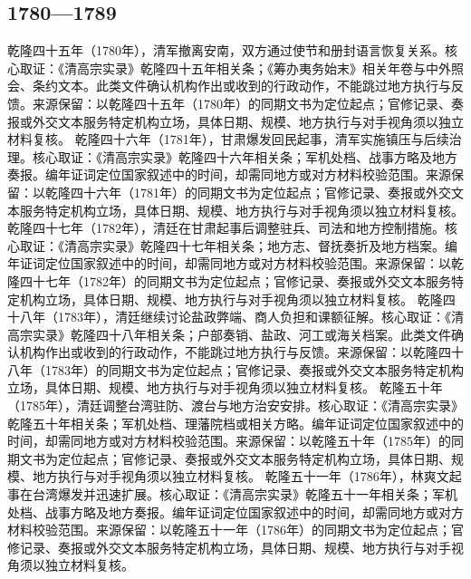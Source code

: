 \subsection{1780—1789}
乾隆四十五年（1780年），清军撤离安南，双方通过使节和册封语言恢复关系。核心取证：《清高宗实录》乾隆四十五年相关条；《筹办夷务始末》相关年卷与中外照会、条约文本。此类文件确认机构作出或收到的行政动作，不能跳过地方执行与反馈。来源保留：以乾隆四十五年（1780年）的同期文书为定位起点；官修记录、奏报或外交文本服务特定机构立场，具体日期、规模、地方执行与对手视角须以独立材料复核。
乾隆四十六年（1781年），甘肃爆发回民起事，清军实施镇压与后续治理。核心取证：《清高宗实录》乾隆四十六年相关条；军机处档、战事方略及地方奏报。编年证词定位国家叙述中的时间，却需同地方或对方材料校验范围。来源保留：以乾隆四十六年（1781年）的同期文书为定位起点；官修记录、奏报或外交文本服务特定机构立场，具体日期、规模、地方执行与对手视角须以独立材料复核。
乾隆四十七年（1782年），清廷在甘肃起事后调整驻兵、司法和地方控制措施。核心取证：《清高宗实录》乾隆四十七年相关条；地方志、督抚奏折及地方档案。编年证词定位国家叙述中的时间，却需同地方或对方材料校验范围。来源保留：以乾隆四十七年（1782年）的同期文书为定位起点；官修记录、奏报或外交文本服务特定机构立场，具体日期、规模、地方执行与对手视角须以独立材料复核。
乾隆四十八年（1783年），清廷继续讨论盐政弊端、商人负担和课额征解。核心取证：《清高宗实录》乾隆四十八年相关条；户部奏销、盐政、河工或海关档案。此类文件确认机构作出或收到的行政动作，不能跳过地方执行与反馈。来源保留：以乾隆四十八年（1783年）的同期文书为定位起点；官修记录、奏报或外交文本服务特定机构立场，具体日期、规模、地方执行与对手视角须以独立材料复核。
乾隆五十年（1785年），清廷调整台湾驻防、渡台与地方治安安排。核心取证：《清高宗实录》乾隆五十年相关条；军机处档、理藩院档或相关方略。编年证词定位国家叙述中的时间，却需同地方或对方材料校验范围。来源保留：以乾隆五十年（1785年）的同期文书为定位起点；官修记录、奏报或外交文本服务特定机构立场，具体日期、规模、地方执行与对手视角须以独立材料复核。
乾隆五十一年（1786年），林爽文起事在台湾爆发并迅速扩展。核心取证：《清高宗实录》乾隆五十一年相关条；军机处档、战事方略及地方奏报。编年证词定位国家叙述中的时间，却需同地方或对方材料校验范围。来源保留：以乾隆五十一年（1786年）的同期文书为定位起点；官修记录、奏报或外交文本服务特定机构立场，具体日期、规模、地方执行与对手视角须以独立材料复核。
